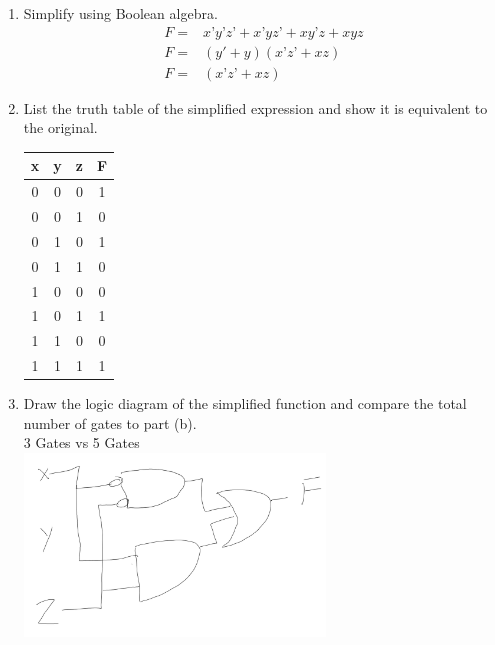 \documentclass[12pt,letterpaper,titlepage]{report}
\begin{document}
\begin{enumerate}[label=\alph*)]
	\item Simplify using Boolean algebra. 
	\begin{align*}
	F =& x’y’z’+ x’yz’ + xy’z +xyz\\
	F =& (y'+y)(x’z’ + xz)\\
	F =& (x’z’ + xz)
	\end{align*}
\pagebreak
	\item List the truth table of the simplified expression and show it is equivalent to the original. \\
	\def\arraystretch{1.5} 
	\begin{tabular}{|c c c|c|}\hline
	x & y & z & F \\\hline
	0 & 0 & 0 & 1 \\\hline
	0 & 0 & 1 & 0 \\\hline
	0 & 1 & 0 & 1 \\\hline
	0 & 1 & 1 & 0 \\\hline
	1 & 0 & 0 & 0 \\\hline
	1 & 0 & 1 & 1 \\\hline
	1 & 1 & 0 & 0 \\\hline
	1 & 1 & 1 & 1 \\\hline
	\end{tabular}
	\item Draw the logic diagram of the simplified function and compare the total number of gates to part (b). \\
		3 Gates vs 5 Gates\\
		\includegraphics[width=8cm]{hw3p4e}

\end{enumerate}
\pagebreak
\end{document}
